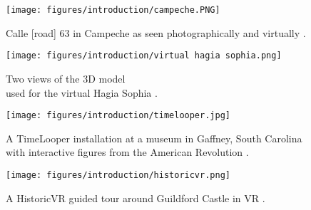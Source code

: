 \documentclass[12pt, a4paper]{article}
\begin{document}
\begin{figure}[]
\begin{minipage}{.48\textwidth}
  \centering
  \texttt{[image: figures/introduction/campeche.PNG]}
  \caption{Calle [road] 63 in Campeche as seen photographically and virtually \cite{existing:campeche}.}
  \label{fig:campeche}
\end{minipage}
\begin{minipage}{.04\textwidth}
  \hspace{0.1cm}
\end{minipage}
\begin{minipage}{.48\textwidth}
  \centering
  \texttt{[image: figures/introduction/virtual hagia sophia.png]}
  \caption{Two views of the 3D model \\ used for the virtual Hagia Sophia \cite{existing:hagia}.}
  \label{fig:hagiasophia}
\end{minipage}
\end{figure}

\begin{figure}
    \centering
    \texttt{[image: figures/introduction/timelooper.jpg]}
    \caption{A TimeLooper installation at a museum in Gaffney, South Carolina with interactive figures from the American Revolution \cite{existing:timelooper}.}
    \label{fig:timelooper}
\end{figure}

\begin{figure}
    \centering
    \texttt{[image: figures/introduction/historicvr.png]}
    \caption{A HistoricVR guided tour around Guildford Castle in VR \cite{existing:historicvr}.}
    \label{fig:historicvr}
\end{figure}
\end{document}
